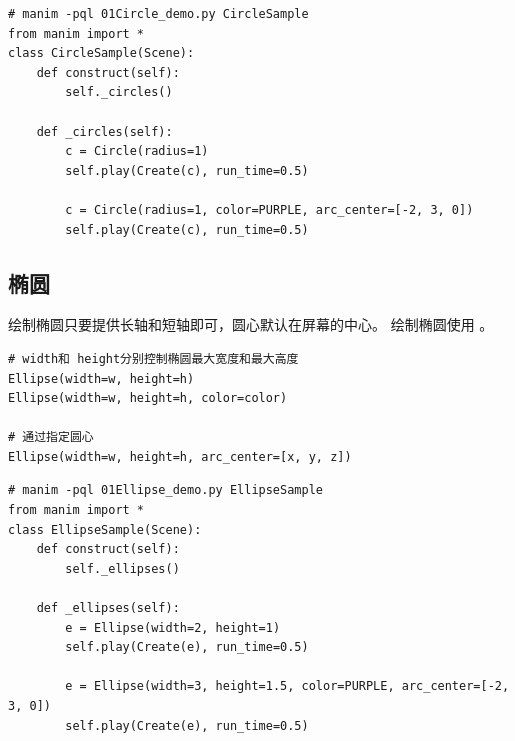 \begin{lstlisting}[style=pythonstyle]
# manim -pql 01Circle_demo.py CircleSample    
from manim import *
class CircleSample(Scene):
    def construct(self):
        self._circles()

    def _circles(self):
        c = Circle(radius=1)
        self.play(Create(c), run_time=0.5)

        c = Circle(radius=1, color=PURPLE, arc_center=[-2, 3, 0])
        self.play(Create(c), run_time=0.5)
\end{lstlisting}

\subsection{椭圆}
绘制椭圆只要提供长轴和短轴即可，圆心默认在屏幕的中心。 绘制椭圆使用 。
\begin{lstlisting}[style=demostyle,numbers=none]
# width和 height分别控制椭圆最大宽度和最大高度
Ellipse(width=w, height=h)
Ellipse(width=w, height=h, color=color)

# 通过指定圆心
Ellipse(width=w, height=h, arc_center=[x, y, z])
\end{lstlisting}

\begin{lstlisting}[style=pythonstyle]
# manim -pql 01Ellipse_demo.py EllipseSample    
from manim import *
class EllipseSample(Scene):
    def construct(self):
        self._ellipses()

    def _ellipses(self):
        e = Ellipse(width=2, height=1)
        self.play(Create(e), run_time=0.5)

        e = Ellipse(width=3, height=1.5, color=PURPLE, arc_center=[-2, 3, 0])
        self.play(Create(e), run_time=0.5)
\end{lstlisting}

